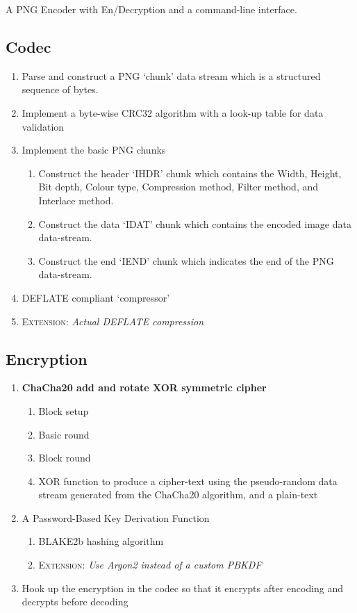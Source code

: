 \documentclass{report}
\begin{document}
A PNG Encoder with En/Decryption and a command-line interface.

\subsection{Codec}
\begin{enumerate}
    \item Parse and construct a PNG `chunk' data stream which is a structured sequence of bytes.
    \item Implement a byte-wise CRC32 algorithm \cite{crc32} with a look-up table for data validation
    \item Implement the basic PNG chunks
    \begin{enumerate}
        \item Construct the header `IHDR' chunk which contains the Width, Height, Bit depth, Colour type, Compression method, Filter method, and Interlace method.
        \item Construct the data `IDAT' chunk which contains the encoded image data data-stream.
        \item Construct the end `IEND' chunk which indicates the end of the PNG data-stream.
    \end{enumerate}
    \item DEFLATE\cite{deflate} compliant `compressor'
    \item \textsc{Extension:} \textit{Actual DEFLATE compression}
\end{enumerate}

\subsection{Encryption}
\begin{enumerate}
    \item \textbf{ChaCha20 add and rotate XOR symmetric cipher}
    \begin{enumerate}
        \item Block setup
        \item Basic round
        \item Block round
        \item XOR function to produce a cipher-text using the pseudo-random data stream generated from the ChaCha20 algorithm, and a plain-text
    \end{enumerate}
    \item A Password-Based Key Derivation Function
    \begin{enumerate}        
        \item BLAKE2b hashing algorithm
        \item \textsc{Extension:} \textit{Use Argon2 instead of a custom PBKDF}
    \end{enumerate}
    \item Hook up the encryption in the codec so that it encrypts after encoding and decrypts before decoding
\end{enumerate}
\end{document}

